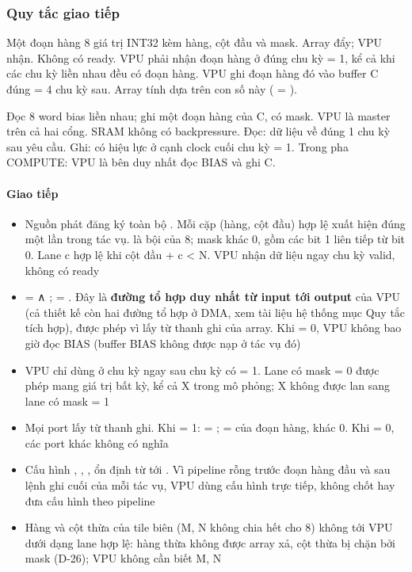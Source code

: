 \documentclass[10pt,a4paper]{article}
\begin{document}
\subsubsection{Quy tắc giao tiếp}

{Một đoạn hàng 8 giá trị INT32 kèm hàng, cột đầu và mask.}
{Array đẩy; VPU nhận. Không có ready.}
{VPU phải nhận đoạn hàng ở đúng chu kỳ  = 1, kể cả khi các chu kỳ liền nhau đều có đoạn hàng.}
{VPU ghi đoạn hàng đó vào buffer C đúng  = 4 chu kỳ sau. Array tính  dựa trên con số này ( = ).}

{Đọc 8 word bias liền nhau; ghi một đoạn hàng của C, có mask.}
{VPU là master trên cả hai cổng. SRAM không có backpressure.}
{Đọc: dữ liệu về đúng 1 chu kỳ sau yêu cầu. Ghi: có hiệu lực ở cạnh clock cuối chu kỳ  = 1.}
{Trong pha COMPUTE: VPU là bên duy nhất đọc BIAS và ghi C.}

\paragraph{Giao tiếp}\label{par:3-2}
\begin{itemize}
\item Nguồn phát đăng ký toàn bộ . Mỗi cặp (hàng, cột đầu) hợp lệ xuất hiện đúng một lần trong tác vụ.  là bội của 8; mask khác 0, gồm các bit 1 liên tiếp từ bit 0. Lane c hợp lệ khi cột đầu + c < N. VPU nhận dữ liệu ngay chu kỳ valid, không có ready
\item {} =  ∧ ;  = . Đây là \textbf{đường tổ hợp duy nhất từ input tới output} của VPU (cả thiết kế còn hai đường tổ hợp ở DMA, xem tài liệu hệ thống mục Quy tắc tích hợp), được phép vì  lấy từ thanh ghi của array. Khi  = 0, VPU không bao giờ đọc BIAS (buffer BIAS không được nạp ở tác vụ đó)
\item VPU chỉ dùng  ở chu kỳ ngay sau chu kỳ có  = 1. Lane có mask = 0 được phép mang giá trị bất kỳ, kể cả X trong mô phỏng; X không được lan sang lane có mask = 1
\item Mọi port  lấy từ thanh ghi. Khi  = 1:  = ;  =  của đoạn hàng, khác 0. Khi  = 0, các port khác không có nghĩa
\item Cấu hình , , ,  ổn định từ  tới . Vì pipeline rỗng trước đoạn hàng đầu và sau lệnh ghi cuối của mỗi tác vụ, VPU dùng cấu hình trực tiếp, không chốt hay đưa cấu hình theo pipeline
\item Hàng và cột thừa của tile biên (M, N không chia hết cho 8) không tới VPU dưới dạng lane hợp lệ: hàng thừa không được array xả, cột thừa bị chặn bởi mask (D-26); VPU không cần biết M, N
\end{itemize}
\end{document}
